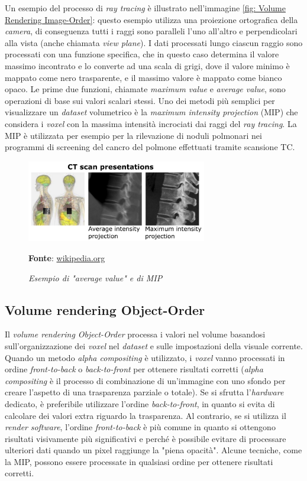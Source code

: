 Un esempio del processo di \emph{ray tracing} è illustrato nell'immagine \ref{fig: Volume Rendering Image-Order}: questo esempio utilizza una proiezione ortografica della \emph{camera}, di conseguenza tutti i raggi sono paralleli l'uno all'altro e perpendicolari alla vista (anche chiamata \emph{view plane}).
I dati processati lungo ciascun raggio sono processati con una funzione specifica, che in questo caso determina il valore massimo incontrato e lo converte ad una scala di grigi, dove il valore minimo è mappato come nero trasparente, e il massimo valore è mappato come bianco opaco. Le prime due funzioni, chiamate \emph{maximum value} e \emph{average value}, sono operazioni di base sui valori scalari stessi. Uno dei metodi più semplici per visualizzare un \emph{dataset} volumetrico è la \emph{maximum intensity projection} (MIP) che considera i \emph{voxel} con la massima intensità incrociati dai raggi del \emph{ray tracing}. La MIP è utilizzata per esempio per la rilevazione di noduli polmonari nei programmi di screening del cancro del polmone effettuati tramite scansione TC.

\begin{figure}[h]
    \centering
    \includegraphics[width=0.7\textwidth]{immagini/volumerendering/mip.jpg}
    \caption{\textit{Esempio di "average value" e di MIP}}
    \textbf{Fonte}: \href{https://en.wikipedia.org/wiki/Maximum_intensity_projection}{wikipedia.org}
    \label{fig: Volume Rendering Example}
\end{figure}

\subsection{Volume rendering Object-Order}\label{sec:volume-object-order}
Il \emph{volume rendering Object-Order} processa i valori nel volume basandosi sull'organizzazione dei \emph{voxel} nel \emph{dataset} e sulle impostazioni della visuale corrente. Quando un metodo \emph{alpha compositing} è utilizzato, i \emph{voxel} vanno processati in ordine \emph{front-to-back} o \emph{back-to-front} per ottenere risultati corretti (\emph{alpha compositing} è il processo di combinazione di un'immagine con uno sfondo per creare l'aspetto di una trasparenza parziale o totale). Se si sfrutta l'\emph{hardware} dedicato, è preferibile utilizzare l'ordine \emph{back-to-front}, in quanto si evita di calcolare dei valori extra riguardo la trasparenza. Al contrario, se si utilizza il \emph{render} \emph{software}, l'ordine \emph{front-to-back} è più comune in quanto si ottengono risultati visivamente più significativi e perché è possibile evitare di processare ulteriori dati quando un pixel raggiunge la "piena opacità". Alcune tecniche, come la MIP, possono essere processate in qualsiasi ordine per ottenere risultati corretti.

